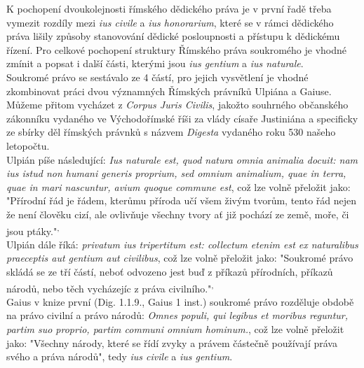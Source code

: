 \documentclass{article}
\begin{document}
K pochopení dvoukolejnosti římského dědického práva je v první řadě třeba vymezit rozdíly mezi \textit{ius civile} a \textit{ius honorarium}, které se v rámci dědického práva lišily způsoby stanovování dědické posloupnosti a přístupu k dědickému řízení. Pro celkové pochopení struktury Římského práva soukromého je vhodné zmínit a popsat i další části, kterými jsou \textit{ius gentium} a \textit{ius naturale}. \\

Soukromé právo se sestávalo ze 4 částí, pro jejich vysvětlení je vhodné zkombinovat práci dvou významných Římských právníků Ulpiána a Gaiuse. Můžeme přitom vycházet z \textit{Corpus Juris Civilis}, jakožto souhrného občanského zákonníku vydaného ve Východořímské říši za vlády císaře Justiniána a specificky ze sbírky děl římských právnků s názvem \textit{Digesta} vydaného roku 530 našeho letopočtu. \\


Ulpián píše následující: \textit{Ius naturale est, quod natura omnia animalia docuit: nam ius istud non humani generis proprium, sed omnium animalium, quae in terra, quae in mari nascuntur, avium quoque commune est}, což lze volně přeložit jako: "Přírodní řád je řádem, kterůmu příroda učí všem živým tvorům, tento řád nejen že není člověku cizí, ale ovlivňuje všechny tvory ať již pochází ze země, moře, či jsou ptáky."\textsuperscript{,} \\

Ulpián dále říká: \textit{privatum ius tripertitum est: collectum etenim est ex naturalibus praeceptis aut gentium aut civilibus}, což lze volně přeložit jako: "Soukromé právo skládá se ze tří částí, neboť odvozeno jest buď z příkazů přírodních, příkazů národů, nebo těch vycházejíc z práva civilního."\textsuperscript{,} \\

Gaius v knize první (Dig. 1.1.9., Gaius 1 inst.) soukromé právo rozděluje obdobě na právo civilní a právo národů: \textit{Omnes populi, qui legibus et moribus reguntur, partim suo proprio, partim communi omnium hominum.}, což lze volně přeložit jako: "Všechny národy, které se řídí zvyky a právem částečně používají práva svého a práva národů", tedy \textit{ius civile} a \textit{ius gentium}. \\
\end{document}
